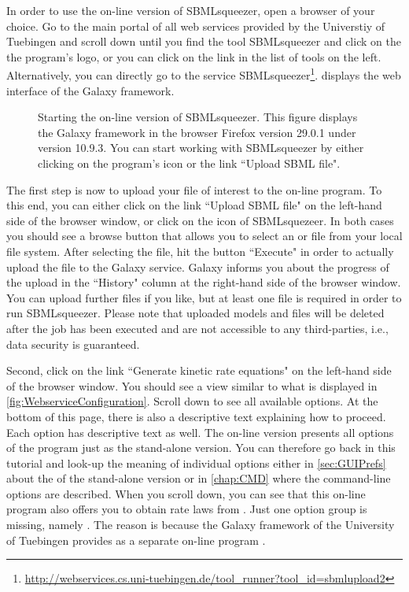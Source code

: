 In order to use the on-line version of SBMLsqueezer, open a browser of your choice.
Go to the main portal of all web services provided by the Universtiy of Tuebingen
and scroll down until you find the tool SBMLsqueezer and click on the the program's logo, or you can click on the link in the list of tools on the left.
Alternatively, you can directly go to the service SBMLsqueezer\footnote{\url{http://webservices.cs.uni-tuebingen.de/tool_runner?tool_id=sbmlupload2}}.
 displays the web interface of the Galaxy framework.
\begin{figure}
\caption[Starting the on-line version of SBMLsqueezer]{Starting the on-line version of SBMLsqueezer.
This figure displays the Galaxy framework in the browser Firefox version 29.0.1 under \MacOSX version 10.9.3.
You can start working with SBMLsqueezer by either clicking on the program's icon or the link ``Upload SBML file".}
\label{fig:WebserviceLaunch}
\end{figure}

The first step is now to upload your \SBML file of interest to the on-line program.
To this end, you can either click on the link ``Upload SBML file" on the left-hand side of the browser window, or click on the icon of SBMLsquezeer.
In both cases you should see a browse button that allows you to select an \XML or \SBML file from your local file system.
After selecting the file, hit the button ``Execute" in order to actually upload the file to the Galaxy service.
Galaxy informs you about the progress of the upload in the ``History" column at the right-hand side of the browser window.
You can upload further files if you like, but at least one file is required in order to run SBMLsqueezer.
Please note that uploaded models and files will be deleted after the job has been executed and are not accessible to any third-parties, i.e., data security is guaranteed.

Second, click on the link ``Generate kinetic rate equations" on the left-hand side of the browser window.
You should see a view similar to what is displayed in \vref{fig:WebserviceConfiguration}.
Scroll down to see all available options.
At the bottom of this page, there is also a descriptive text explaining how to proceed.
Each option has descriptive text as well.
The on-line version presents all options of the program just as the stand-alone version.
You can therefore go back in this tutorial and look-up the meaning of individual options either in \vref{sec:GUIPrefs} about the \GUI of the stand-alone version or in \vref{chap:CMD} where the command-line options are described.
When you scroll down, you can see that this on-line program also offers you to obtain rate laws from \SABIO.
Just one option group is missing, namely \SBMLLaTeX.
The reason is because the Galaxy framework of the University of Tuebingen provides \SBMLLaTeX as a separate on-line program \citep{Draeger2009b}.

